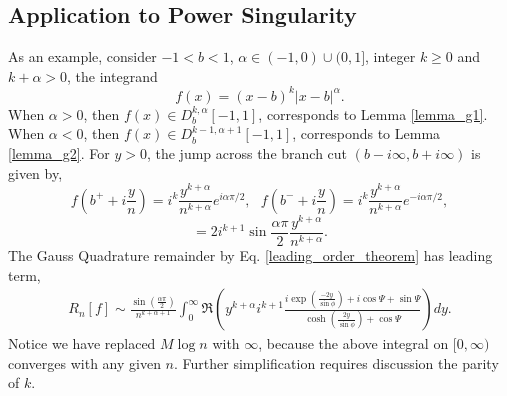 \documentclass[11pt]{article}
\begin{document}
\subsection{Application to Power Singularity\label{power_function}} As an example, consider $-1<b<1$, $\alpha \in (-1,0) \cup (0,1]$, integer $k \geq 0$ and $k + \alpha >0$, the integrand
\begin{equation}
    f(x) = (x-b)^{k} |x-b|^{\alpha}. \label{power_singular_function}
\end{equation}
When $\alpha>0$, then $f(x) \in D^{k,\alpha}_b[-1,1]$, corresponds to Lemma \ref{lemma_g1}. When $\alpha<0$, then $f(x) \in D^{k-1,\alpha+1}_b[-1,1]$, corresponds to Lemma \ref{lemma_g2}. For $y>0$, the jump across the branch cut $(b-i\infty,b+i\infty)$ is given by,
\begin{equation}
    f(b^++i\frac{y}{n}) = i^k \frac{y^{k+\alpha}}{n^{k+\alpha}} e^{i\alpha \pi/2},\ \ \  f(b^-+i\frac{y}{n}) = i^k \frac{y^{k+\alpha}}{n^{k+\alpha}} e^{-i\alpha \pi/2},
\end{equation}
\begin{equation}
    [f(b+i\frac{y}{n})] = 2i^{k+1}\sin \frac{\alpha \pi} {2} \frac{y^{k+\alpha}}{n^{k+\alpha}}.
\end{equation}
The Gauss Quadrature remainder by Eq. \eqref{leading_order_theorem} has leading term,
\begin{eqnarray}
        R_n[f] \sim \frac{\sin(\frac{\alpha\pi}{2})}{ n^{k+\alpha+1}}\int_{0}^{\infty} \Re \left(y^{k+\alpha} i^{k+1}\frac{  i\exp\left(\frac{-2y}{\sin\phi}\right) + i\cos \Psi + \sin \Psi  }{\cosh\left(\frac{2y}{\sin\phi}\right) + \cos \Psi} \right)dy.
    \end{eqnarray}
Notice we have replaced $M\log n$ with $\infty$, because the above integral on $[0,\infty)$ converges with any given $n$. Further simplification requires discussion the parity of $k$.
\end{document}
